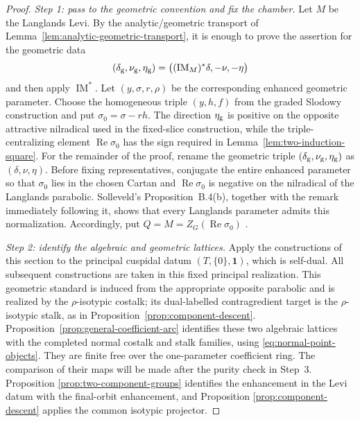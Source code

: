 \documentclass[11pt]{amsart}
\theoremstyle{definition}
\theoremstyle{remark}
\begin{document}
\begin{proof}
\smallskip
\noindent\emph{Step 1: pass to the geometric convention and fix the chamber.}
Let $M$ be the Langlands Levi.  By the
analytic/geometric transport of
Lemma~\ref{lem:analytic-geometric-transport}, it is enough to prove
the assertion for the geometric data
\[
 (\delta_{\rm g},\nu_{\rm g},\eta_{\rm g})
 =\bigl((\operatorname{IM}_M)^*\delta,-\nu,-\eta\bigr)
\]
and then apply $\operatorname{IM}^*$.  Let
$(y,\sigma,r,\rho)$ be the corresponding enhanced geometric parameter.
Choose the homogeneous triple $(y,h,f)$ from the graded Slodowy construction
and put $\sigma_0=\sigma-rh$.  The direction $\eta_{\rm g}$ is positive on the
opposite attractive nilradical used in the fixed-slice construction, while
the triple-centralizing element $\operatorname{Re}\sigma_0$ has the sign
required in Lemma~\ref{lem:two-induction-square}.  For the remainder of the proof,
rename the geometric triple $(\delta_{\rm g},\nu_{\rm g},\eta_{\rm g})$ as
$(\delta,\nu,\eta)$.
Before fixing representatives, conjugate the entire enhanced parameter so
that $\sigma_0$ lies in the chosen Cartan and
$\operatorname{Re}\sigma_0$ is negative on the nilradical of the Langlands
parabolic.  Solleveld's Proposition~B.4(b), together with the remark
immediately following it, shows that every Langlands parameter admits this
normalization.  Accordingly, put
$Q=M=Z_G(\operatorname{Re}\sigma_0)$
\cite[Proposition~B.4(b) and the following remark]{Solleveld}.

\smallskip
\noindent\emph{Step 2: identify the algebraic and geometric lattices.}
Apply the constructions of this section to the principal cuspidal datum
$(T,\{0\},\mathbf1)$, which is self-dual.  All subsequent constructions are
taken in this fixed principal realization.
This geometric standard is induced from the appropriate opposite parabolic
and is realized by the $\rho$-isotypic costalk; its dual-labelled
contragredient target is the $\rho$-isotypic stalk, as in
Proposition~\ref{prop:component-descent}.
Proposition~\ref{prop:general-coefficient-arc}
identifies these two algebraic lattices with the completed normal
costalk and stalk families, using \eqref{eq:normal-point-objects}.
They are finite free over the one-parameter coefficient ring.  The
comparison of their maps will be made after the purity check in Step~3.  Proposition
\ref{prop:two-component-groups} identifies the enhancement in the Levi datum
with the final-orbit enhancement, and Proposition
\ref{prop:component-descent} applies the common isotypic projector.


\end{proof}
\end{document}
